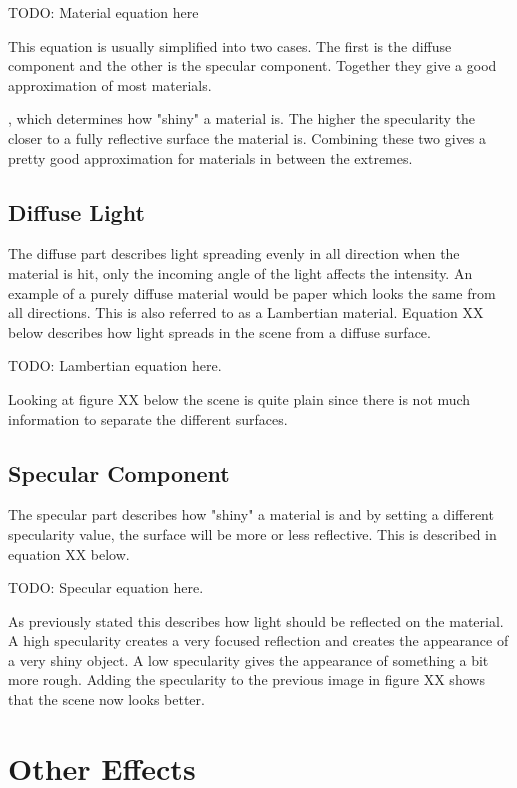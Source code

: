TODO: Material equation here

This equation is usually simplified into two cases. The first is the diffuse component and the other is the specular component. Together they give a good approximation of most materials.

, which determines how "shiny" a material is.
The higher the specularity the closer to a fully reflective surface the material is. Combining these two gives a pretty good approximation for materials in between the extremes.

\subsection{Diffuse Light}

The diffuse part describes light spreading evenly in all direction when the material is hit, only the incoming angle of the light affects the intensity. An example of a purely diffuse material would be paper which looks the same from all directions. This is also referred to as a Lambertian material. Equation XX below describes how light spreads in the scene from a diffuse surface.

TODO: Lambertian equation here.

Looking at figure XX below the scene is quite plain since there is not much information to separate the different surfaces.

\subsection{Specular Component}

The specular part describes how "shiny" a material is and by setting a different specularity value, the surface will be more or less reflective. This is described in equation XX below.

TODO: Specular equation here.

As previously stated this describes how light should be reflected on the material. A high specularity creates a very focused reflection and creates the appearance of a very shiny object. A low specularity gives the appearance of something a bit more rough. Adding the specularity to the previous image in figure XX shows that the scene now looks better.

\section{Other Effects}

